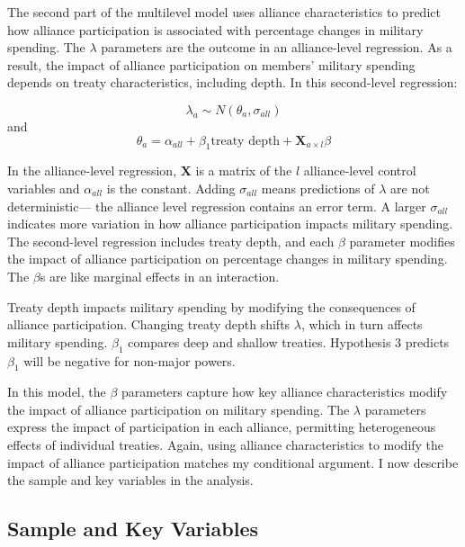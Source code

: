 \documentclass[12pt]{article}
\begin{document}
The second part of the multilevel model uses alliance characteristics to predict how alliance participation is associated with percentage changes in military spending. 
The $\lambda$ parameters are the outcome in an alliance-level regression.
As a result, the impact of alliance participation on members' military spending depends on treaty characteristics, including depth. 
In this second-level regression: 


\begin{equation}
\lambda_{a} \sim N(\theta_{a}, \sigma_{all})
\end{equation} 
and 
\begin{equation}
\theta_{a} = \alpha_{all} + \beta_1 \mbox{treaty depth} + \textbf{X}_{a \times l} \beta
\end{equation}


In the alliance-level regression, $\textbf{X}$ is a matrix of the $l$ alliance-level control variables and $\alpha_{all}$ is the constant.
Adding $\sigma_{all}$ means predictions of $\lambda$ are not deterministic--- the alliance level regression contains an error term. 
A larger $\sigma_{all}$ indicates more variation in how alliance participation impacts military spending. 
The second-level regression includes treaty depth, and each $\beta$ parameter modifies the impact of alliance participation on percentage changes in military spending. 
The $\beta$s are like marginal effects in an interaction. 


Treaty depth impacts military spending by modifying the consequences of alliance participation. 
Changing treaty depth shifts $\lambda$, which in turn affects military spending.
$\beta_1$ compares deep and shallow treaties. 
Hypothesis 3 predicts $\beta_1$ will be negative for non-major powers. 


In this model, the $\beta$ parameters capture how key alliance characteristics modify the impact of alliance participation on military spending. 
The $\lambda$ parameters express the impact of participation in each alliance, permitting heterogeneous effects of individual treaties. 
Again, using alliance characteristics to modify the impact of alliance participation matches my conditional argument. 
I now describe the sample and key variables in the analysis.  



\subsection{Sample and Key Variables} 
\end{document}
